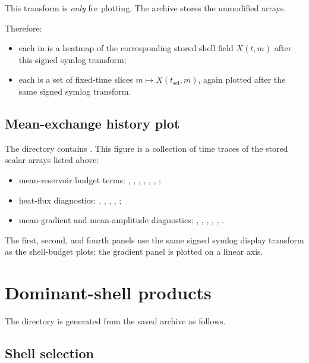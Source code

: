 \documentclass[11pt]{article}
\begin{document}
This transform is \emph{only} for plotting. The archive stores the unmodified
arrays.

Therefore:
\begin{itemize}
\item each  in  is a heatmap of the
  corresponding stored shell field \(X(t,m)\) after this signed symlog
  transform;
\item each  is a set of fixed-time slices
  \(m \mapsto X(t_{\mathrm{sel}},m)\), again plotted after the same signed
  symlog transform.
\end{itemize}

\subsection{Mean-exchange history plot}

The directory  contains
. This figure is a collection of time traces of
the stored scalar arrays listed above:
\begin{itemize}
\item mean-reservoir budget terms:
  ,
  ,
  ,
  ,
  ,
  ,
  ;
\item heat-flux diagnostics:
  ,
  ,
  ,
  ,
  ;
\item mean-gradient and mean-amplitude diagnostics:
  , , ,
  , , .
\end{itemize}
The first, second, and fourth panels use the same signed symlog display
transform as the shell-budget plots; the gradient panel is plotted on a linear
axis.

\section{Dominant-shell products}

The directory  is generated from the saved archive as
follows.

\subsection{Shell selection}
\end{document}
